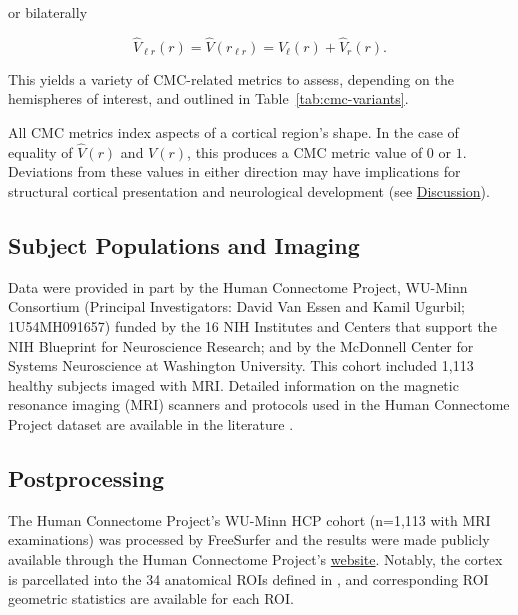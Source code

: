 \documentclass{article}
\newcommand{\CMC}{\(\text{CMC}\) }
\begin{document}
or bilaterally

\begin{equation} \label{eq:ev-bilateral}
\hat{V}_{\ell r}(r) = \hat{V}(r_{\ell r}) = \hat{V}_{\ell}(r) + \hat{V}_r(r).
\end{equation}

This yields a variety of CMC-related metrics to assess, depending on the
hemispheres of interest, and outlined in Table~\ref{tab:cmc-variants}.


All CMC metrics index aspects of a cortical region's shape. In the case of
equality of \(\hat{V}(r)\) and \(V(r)\), this produces a \CMC metric value of
\(0\) or \(1\). Deviations from these values in either direction may have
implications for structural cortical presentation and neurological
development (see \hyperref[sec:discussion]{Discussion}).

\subsection{Subject Populations and Imaging}
\label{sec:population}

Data were provided in part by the Human Connectome Project, WU-Minn
Consortium (Principal Investigators: David Van Essen and Kamil Ugurbil;
1U54MH091657) funded by the 16 NIH Institutes and Centers that support the
NIH Blueprint for Neuroscience Research; and by the McDonnell Center for
Systems Neuroscience at Washington University. This cohort included 1,113
healthy subjects imaged with MRI\@. Detailed information on the magnetic
resonance imaging (MRI) scanners and protocols used in the Human Connectome
Project dataset are available in the literature
\citep{elamHumanConnectomeProject2021}.


\subsection{Postprocessing}
\label{sec:postprocessing}

The Human Connectome Project's WU-Minn HCP cohort (n=1,113 with MRI
examinations) was processed by FreeSurfer \citep{fischlFreeSurfer2012} and
the results were made publicly available through the Human Connectome
Project's \href{%
https://www.humanconnectome.org/study/hcp-young-adult/document/1200-subjects-data-release}{website}.
Notably, the cortex is parcellated into the 34 anatomical ROIs defined in
\citet{desikanAutomatedLabelingSystem2006}, and corresponding ROI geometric
statistics are available for each ROI.
\end{document}
